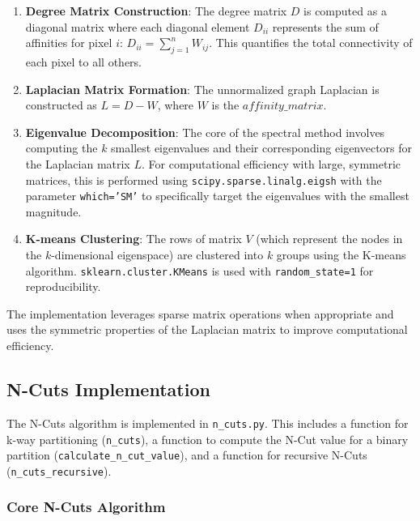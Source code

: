 \documentclass[12pt,a4paper]{article}
\begin{document}
\begin{enumerate}
    \item \textbf{Degree Matrix Construction}: The degree matrix $D$ is computed as a diagonal matrix where each diagonal element $D_{ii}$ represents the sum of affinities for pixel $i$: $D_{ii} = \sum_{j=1}^{n} W_{ij}$. This quantifies the total connectivity of each pixel to all others.
    
    \item \textbf{Laplacian Matrix Formation}: The unnormalized graph Laplacian is constructed as $L = D - W$, where $W$ is the $affinity\_matrix$. 
    
    \item \textbf{Eigenvalue Decomposition}: The core of the spectral method involves computing the $k$ smallest eigenvalues and their corresponding eigenvectors for the Laplacian matrix $L$. For computational efficiency with large, symmetric matrices, this is performed using \texttt{scipy.sparse.linalg.eigsh} with the parameter \texttt{which='SM'} to specifically target the eigenvalues with the smallest magnitude. 
        
    \item \textbf{K-means Clustering}: The rows of matrix $V$ (which represent the nodes in the $k$-dimensional eigenspace) are clustered into $k$ groups using the K-means algorithm. \texttt{sklearn.cluster.KMeans} is used with \texttt{random\_state=1} for reproducibility.
\end{enumerate}

The implementation leverages sparse matrix operations when appropriate and uses the symmetric properties of the Laplacian matrix to improve computational efficiency. 

\subsection{N-Cuts Implementation}
\label{subsec:ncuts_impl}

The N-Cuts algorithm is implemented in {\texttt{n\_cuts.py}}. This includes a function for k-way partitioning ({\texttt{n\_cuts}}), a function to compute the N-Cut value for a binary partition ({\texttt{calculate\_n\_cut\_value}}), and a function for recursive N-Cuts ({\texttt{n\_cuts\_recursive}}).

\subsubsection{Core N-Cuts Algorithm}
\end{document}
